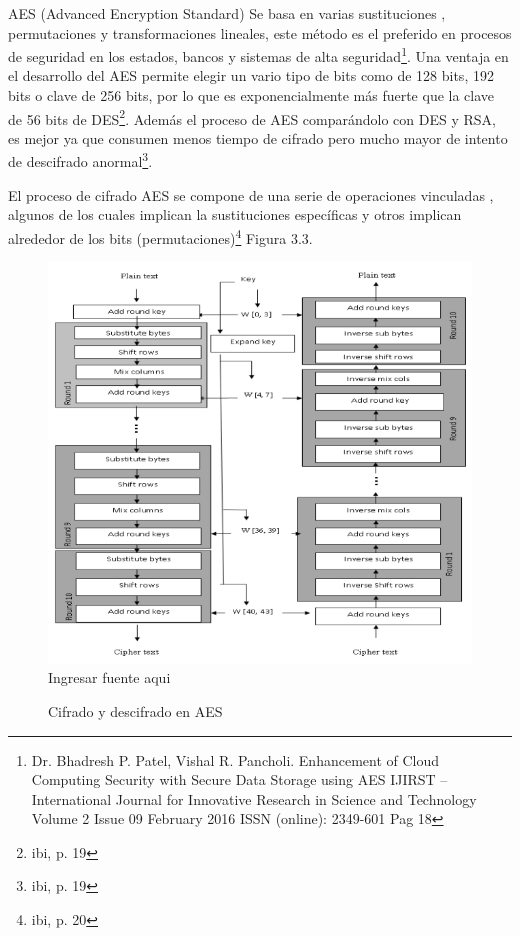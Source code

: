 \documentclass[a4paper,openright,12pt]{book}
\theoremstyle{definition}
\theoremstyle{remark}
\begin{document}
AES (Advanced Encryption Standard) Se basa en varias sustituciones , permutaciones y transformaciones lineales, este método es el preferido en procesos de seguridad en los estados, bancos y sistemas de alta seguridad\footnote{Dr. Bhadresh P. Patel, Vishal R. Pancholi. Enhancement of Cloud Computing Security with Secure Data Storage using AES IJIRST –International Journal for Innovative Research in Science and Technology Volume 2 Issue 09 February 2016 ISSN (online): 2349-601 Pag 18}. Una ventaja en el desarrollo del AES permite elegir un vario tipo de bits como de 128 bits, 192 bits o clave de 256 bits, por lo que es exponencialmente más fuerte que la clave de 56 bits de DES\footnote{ibi, p. 19}. Además el proceso de AES comparándolo con DES y RSA, es mejor ya que consumen menos tiempo de cifrado pero mucho mayor de intento de descifrado anormal\footnote{ibi, p. 19}.  

El proceso de cifrado AES se compone de una serie de operaciones vinculadas , algunos de los cuales implican la sustituciones específicas y otros implican alrededor de los bits (permutaciones)\footnote{ibi, p.  20} Figura 3.3. 

\begin{figure}[htb]
\centering
\caption{Cifrado y descifrado en AES} 
\includegraphics[scale=0.3]{AES}
\label{fig:CifradoAES}
\\Ingresar fuente aqui
\end{figure}
\end{document}
